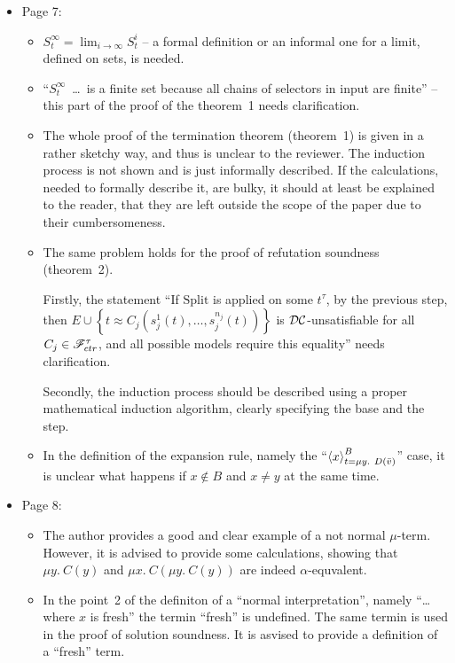 \begin{itemize}
	\item Page 7:
	\begin{itemize}
		\item $S_t^\infty = \lim_{i \rightarrow \infty} S^i_t$ -- a formal definition or an informal one for a limit, defined on sets, is needed.
		\item ``$S_t^\infty$~\dots~is a finite set because all chains of selectors in input are finite'' -- this part of the proof of the theorem~1 needs clarification.
		
		\item The whole proof of the termination theorem (theorem~1) is given in a rather sketchy way, and thus is unclear to the reviewer. The induction process is not shown and is just informally described. If the calculations, needed to formally describe it, are bulky, it should at least be explained to the reader, that they are left outside the scope of the paper due to their cumbersomeness.
		
		\item The same problem holds for the proof of refutation soundness (theorem~2).


		Firstly, the statement ``If $\mathrm{Split}$ is applied on some $t^\tau$, by the previous step, then $E \cup \left\{ t \approx C_j\left( s_j^1(t),\dots,s_j^{n_j}(t) \right) \right\}$ is $\mathcal{DC}$-unsatisfiable for all $C_j \in \mathscr{F}^\tau_{ctr}$, and all possible models require this equality'' needs clarification.


		Secondly, the induction process should be described using a proper mathematical induction algorithm, clearly specifying the base and the step.

		\item In the definition of the expansion rule, namely the ``$\left\langle x \right\rangle^B_{t = \mu y.\ D(\bar{v})}$'' case, it is unclear what happens if $x \notin B$ and $x \ne y$ at the same time.
	\end{itemize}

	\item Page 8:
	\begin{itemize}
		\item The author provides a good and clear example of a not normal $\mu$-term. However, it is advised to provide some calculations, showing that $\mu y.\ C(y)$ and $\mu x.\ C(\mu y.\ C(y))$ are indeed $\alpha$-equvalent.

		\item In the point~2 of the definiton of a ``normal interpretation'', namely ``\dots where $x$ is fresh'' the termin ``fresh'' is undefined. The same termin is used in the proof of solution soundness. It is asvised to provide a definition of a ``fresh'' term.
	\end{itemize}


\end{itemize}

